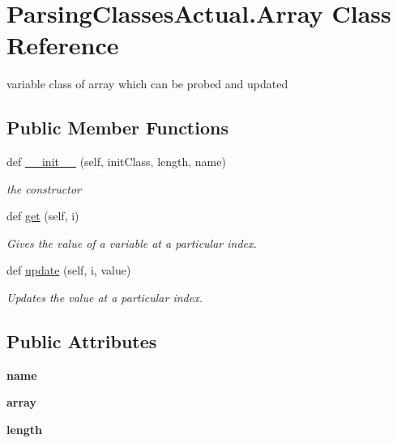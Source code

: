 \hypertarget{class_parsing_classes_actual_1_1_array}{}\section{Parsing\+Classes\+Actual.\+Array Class Reference}
\label{class_parsing_classes_actual_1_1_array}


variable class of array which can be probed and updated  


\subsection*{Public Member Functions}
\begin{DoxyCompactItemize}
\item 
def \hyperlink{class_parsing_classes_actual_1_1_array_a749c8cc0cbee51cd8ac220c3afe4cccb}{\+\_\+\+\_\+init\+\_\+\+\_\+} (self, init\+Class, length, name)
\begin{DoxyCompactList}\small\item\em the constructor \end{DoxyCompactList}\item 
def \hyperlink{class_parsing_classes_actual_1_1_array_a0c67900f761bc072ed1f2a49ead7a0da}{get} (self, i)
\begin{DoxyCompactList}\small\item\em Gives the value of a variable at a particular index. \end{DoxyCompactList}\item 
def \hyperlink{class_parsing_classes_actual_1_1_array_a2a61097f1b529f1bdc8dcc4639e44414}{update} (self, i, value)
\begin{DoxyCompactList}\small\item\em Updates the value at a particular index. \end{DoxyCompactList}\end{DoxyCompactItemize}
\subsection*{Public Attributes}
\begin{DoxyCompactItemize}
\item 
{\bfseries name}\hypertarget{class_parsing_classes_actual_1_1_array_a0bc21e5ecf1ea116733950ea94fd355a}{}\label{class_parsing_classes_actual_1_1_array_a0bc21e5ecf1ea116733950ea94fd355a}

\item 
{\bfseries array}\hypertarget{class_parsing_classes_actual_1_1_array_a14c6e3eeac80e550ac15348387db7d4b}{}\label{class_parsing_classes_actual_1_1_array_a14c6e3eeac80e550ac15348387db7d4b}

\item 
{\bfseries length}\hypertarget{class_parsing_classes_actual_1_1_array_ac70adad351ea231f59e98c7df142e82c}{}\label{class_parsing_classes_actual_1_1_array_ac70adad351ea231f59e98c7df142e82c}

\end{DoxyCompactItemize}


